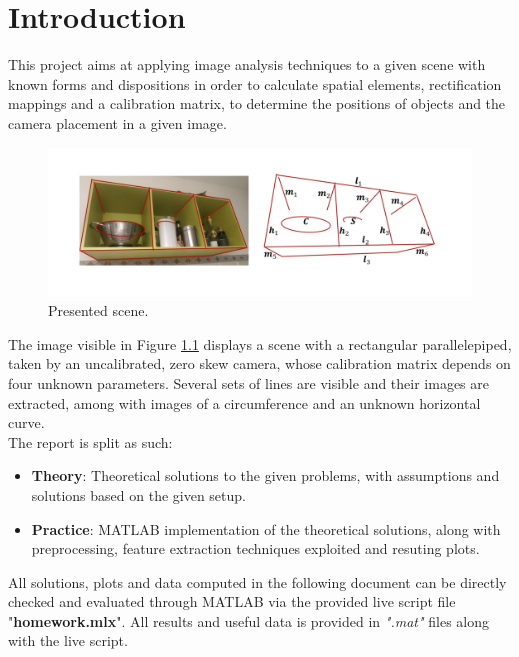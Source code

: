 \documentclass{Configuration_Files/PoliMi3i_thesis}
\begin{document}
\mainmatter %

\chapter{Introduction}
\label{ch:chapter_one}%

This project aims at applying image analysis techniques to a given scene with known forms and dispositions in order to calculate spatial elements, rectification mappings and a calibration matrix, to determine the positions of objects and the camera placement in a given image.

\begin{figure}[h]
\centering
\includegraphics[width=1\linewidth]{scene.jpg}
\caption{\label{fig:scene}Presented scene.}
\end{figure}

The image visible in Figure \ref{fig:scene} displays a scene with a rectangular parallelepiped, taken by an uncalibrated, zero skew camera, whose calibration matrix depends on four unknown parameters.
Several sets of lines are visible and their images are extracted, among with images of a circumference and an unknown horizontal curve.\\
The report is split as such:
\begin{itemize}
    \item\textbf{Theory}: Theoretical solutions to the given problems, with assumptions and solutions based on the given setup.
    \item\textbf{Practice}: MATLAB implementation of the theoretical solutions, along with preprocessing, feature extraction techniques exploited and resuting plots.
\end{itemize} 
All solutions, plots and data computed in the following document can be directly checked and evaluated through MATLAB via the provided live script file "\textbf{homework.mlx}". All results and useful data is provided in \textit{".mat"} files along with the live script.
\end{document}
